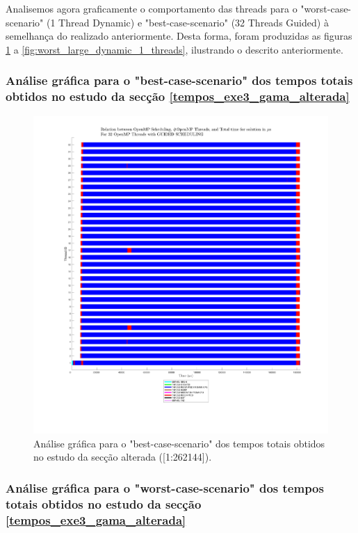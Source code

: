 \documentclass[a4paper]{article}
\begin{document}
\label{tempos_exe3_gama_alterada}
Analisemos agora graficamente o comportamento das threads para o "worst-case-scenario" (1 Thread Dynamic) e "best-case-scenario" (32 Threads Guided) à semelhança do realizado anteriormente.
Desta forma, foram produzidas as figuras \ref{fig:best_large_guided_32_threads} a \ref{fig:worst_large_dynamic_1_threads}, ilustrando o descrito anteriormente.\par 


\subsubsection{Análise gráfica para o "best-case-scenario" dos tempos totais obtidos no estudo da secção \ref{tempos_exe3_gama_alterada}}

\begin{figure}[H]
\centering
\includegraphics[width=0.9\columnwidth]{PNG/best_large_guided_32_threads.png}
\caption{ Análise gráfica para o "best-case-scenario" dos tempos totais obtidos no estudo da secção alterada ([1:262144]).  }
\label{fig:best_large_guided_32_threads}
\end{figure}


\subsubsection{Análise gráfica para o "worst-case-scenario" dos tempos totais obtidos no estudo da secção \ref{tempos_exe3_gama_alterada}}
\end{document}
